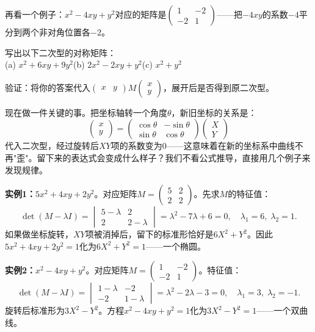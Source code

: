 再看一个例子：$x^2-4xy+y^2$对应的矩阵是$\begin{pmatrix}1&-2\\-2&1\end{pmatrix}$——把$-4xy$的系数$-4$平分到两个非对角位置各$-2$。

\begin{exercise}
\item 写出以下二次型的对称矩阵：\\
(a) $x^2+6xy+9y^2$\quad (b) $2x^2-2xy+y^2$\quad (c) $x^2+y^2$
\item 验证：将你的答案代入$\begin{pmatrix}x&y\end{pmatrix}M\begin{pmatrix}x\\y\end{pmatrix}$，展开后是否得到原二次型。
\end{exercise}


现在做一件关键的事。把坐标轴转一个角度$\theta$，新旧坐标的关系是：
\[
\begin{pmatrix}x\\y\end{pmatrix}
= \begin{pmatrix}\cos\theta&-\sin\theta\\\sin\theta&\cos\theta\end{pmatrix}
\begin{pmatrix}X\\Y\end{pmatrix}
\]
代入二次型，经过旋转后$XY$项的系数变为$0$——这意味着在新的坐标系中曲线不再"歪"。留下来的表达式会变成什么样子？我们不看公式推导，直接用几个例子来发现规律。

\vspace{0.2cm}
\noindent\textbf{实例1：}$5x^2+4xy+2y^2$。对应矩阵$M=\begin{pmatrix}5&2\\2&2\end{pmatrix}$。先求$M$的特征值：
\[
\det(M-\lambda I)=\begin{vmatrix}5-\lambda&2\\2&2-\lambda\end{vmatrix}=\lambda^2-7\lambda+6=0,\quad\lambda_1=6,\;\lambda_2=1.
\]
如果做坐标旋转，$XY$项被消掉后，留下的标准形恰好是$6X^2+Y^2$。因此$5x^2+4xy+2y^2=1$化为$6X^2+Y^2=1$——一个椭圆。

\vspace{0.2cm}
\noindent\textbf{实例2：}$x^2-4xy+y^2$。对应矩阵$M=\begin{pmatrix}1&-2\\-2&1\end{pmatrix}$。特征值：
\[
\det(M-\lambda I)=\begin{vmatrix}1-\lambda&-2\\-2&1-\lambda\end{vmatrix}=\lambda^2-2\lambda-3=0,\quad\lambda_1=3,\;\lambda_2=-1.
\]
旋转后标准形为$3X^2-Y^2$。方程$x^2-4xy+y^2=1$化为$3X^2-Y^2=1$——一个双曲线。

